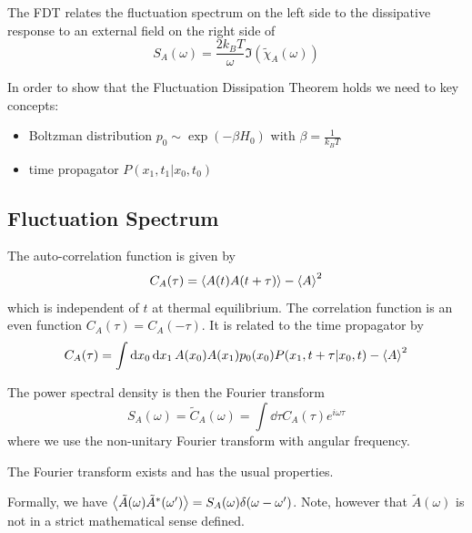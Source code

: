 \documentclass{/home/ben/Templates/notebook}
\begin{document}
	\begin{theorem}
		The FDT relates the fluctuation spectrum on the left side to the dissipative response to an external field on the right side of
		\begin{equation}
		S_A(\omega) = \frac{2 k_B T}{\omega} \Im (\tilde{\chi}_A(\omega))
		\end{equation}
	\end{theorem}
	
	In order to show that the Fluctuation Dissipation Theorem holds we need to key concepts:
	\begin{itemize}
		\item{Boltzman distribution $p_0 \sim \exp(- \beta H_0)$ with $\beta = \frac{1}{k_B T}$}
		\item{time propagator $P(x_1, t_1 | x_0, t_0)$}
	\end{itemize}
	
	
	\subsection*{Fluctuation Spectrum}
	
	The auto-correlation function is given by
	\begin{equation}
	C_A(\tau) = \expval{A(t) A(t+\tau)} - \expval{A}^2
	\end{equation}
	which is independent of $t$ at thermal equilibrium. The correlation function is an even function $C_A(\tau) = C_A(-\tau)$. It is related to the time propagator by 
	\begin{equation}
	C_A(\tau) = \int \dd{x_0} \dd{x_1} A(x_0) A(x_1) p_0(x_0) P(x_1, t+\tau | x_0, t) - \expval{A}^2
	\end{equation}
	
	The power spectral density is then the Fourier transform
	\begin{equation}
	S_A(\omega) = \tilde{C}_A(\omega) = \int \dd{\tau} C_A(\tau) e^{i \omega \tau}
	\end{equation}
	where we use the non-unitary Fourier transform with angular frequency. 
	\begin{theorem}
		The Fourier transform exists and has the usual properties.
	\end{theorem}
	Formally, we have $\expval{\tilde{A}(\omega) \tilde{A}^*(\omega')} = S_A(\omega) \delta(\omega - \omega')$. Note, however that $\tilde{A}(\omega)$ is not in a strict mathematical sense defined.
	
\end{document}
